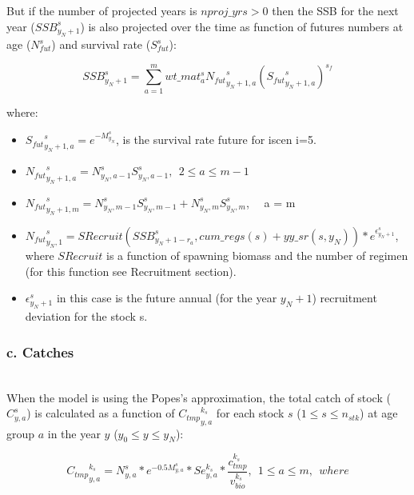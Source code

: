 \documentclass{article}
\begin{document}
But if the number of projected years is $nproj\_yrs>0$ then the SSB for the next year ($SSB^s_{y_N+1}$) is also projected over the time as function of futures numbers at age ($N^s_{fut}$) and survival rate ($S^s_{fut}$): 

\begin{equation}
    SSB^s_{y_N+1}= \sum_{a=1}^m wt\_{mat}^s_a{N_{fut}}^s_{y_N+1,a}({{S_{fut}}^s_{y_N+1,a}})^{s_f}
\end{equation}

where: 

\begin{itemize}

    \item ${S_{fut}}^s_{y_N+1,a} = e^{-M^s_{y_N}}$, is the survival rate future for iscen i=5.

    \item ${N_{fut}}^s_{y_N+1,a} = N^s_{y_N,a-1}S^s_{y_N,a-1}, \ \ 2\leq a \leq m-1$
    
    \item ${N_{fut}}^s_{y_N+1,m} = N^s_{y_N,m-1}S^s_{y_N,m-1}+N^s_{y_N,m}S^s_{y_N,m}$, \ \ a = m 
    
    \item ${N_{fut}}^s_{y_N,1} = SRecruit(SSB^s_{y_N+1-r_a},cum\_regs(s)+yy\_sr(s,y_N))*e^{\epsilon^s_{y_N+1}}$, where $SRecruit$ is a function of  spawning biomass and the number of regimen (for this function see Recruitment section).
    \item $\epsilon^s_{y_N+1}$ in this case is the future annual (for the year $y_N+1$) recruitment deviation for the stock s. 
    
\end{itemize}


\hfill

\subsubsection{c. Catches}\\

When the model is using the Popes's approximation, the total catch of stock ($C^s_{y,a}$) is calculated as a function of ${C_{tmp}}^{k_s}_{y,a}$ for each stock $s$ ($1\leq s \leq n_{stk}$) at age group $a$ in the year $y$ ($y_0 \leq y \leq y_N$): 

\begin{equation}
{C_{tmp}}^{k_s}_{y,a}=N^s_{y,a}*e^{-0.5M^s_{y,a}}* Se_{y,a}^{k_s}* \dfrac{c_{tmp}^{k_s}}{v_{bio}^{k_s}}, \ \  1\leq a \leq m, \ \ where
\end{equation}
\end{document}
